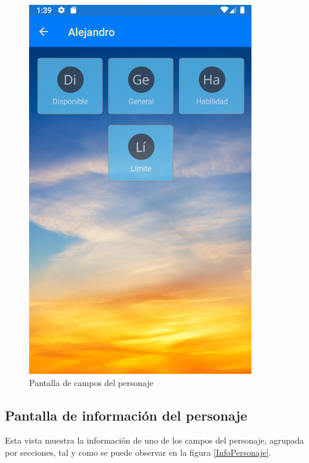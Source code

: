 \begin{figure}[H]
    \centering
    \includegraphics[scale=0.3]{Figures/Capturas/CamposPersonaje.png}
    \caption{Pantalla de campos del personaje}
    \label{CamposPersonaje}    
\end{figure}

\subsection{Pantalla de información del personaje}
Esta vista muestra la información de uno de los campos del personaje, agrupada por secciones, tal y como 
se puede observar en la figura \ref*{InfoPersonaje}.


